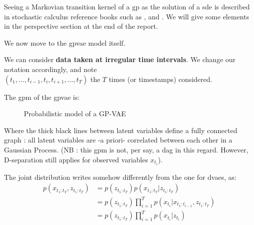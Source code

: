 Seeing a Markovian transition kernel of a \gls{gp} as the solution of a \gls{sde} is described in stochastic calculus reference books such as \cite{mouvement-brownien-calcul-ito}, \cite{sarkka_applied_2019} and \cite{cours-jf-legall}. We will give some elements in the perspective section at the end of the report.

We now move to the \gls{gpvae} model itself.

We can consider \textbf{data taken at irregular time intervals}. We change our notation accordingly, and note \\
$(t_1, ..., t_{i-1}, t_i, t_{i+1}, ..., t_T)$ the $T$ times (or timestamps) considered. 

The \gls{gpm} of the \gls{gpvae} is:

\begin{figure}[H]
    \centering
    \label{fig:graphical_model_gpvae}
\caption{Probabilistic model of a GP-VAE}
\end{figure}

Where the thick black lines between latent variables define a fully connected graph : all latent variables are -a priori- correlated between each other in a Gaussian Process. (NB : this \gls{gpm} is not, per say, a \gls{dag} in this regard. However, D-separation still applies for observed variables $x_{t_i}$).

The joint distribution writes somehow differently from the one for \glspl{dvae}, as:
\begin{align}
\label{joint_gpvae}
    p(x_{t_1:t_T}, z_{t_1:t_T}) &= p(z_{t_1:t_T}) p(x_{t_1:t_T} \vert z_{t_1:t_T}) \\
    &= p(z_{t_1:t_T}) \prod_{i=1}^T p(x_{t_i} \vert x_{t_1:t_{i-1}}, z_{t_1:t_T}) \\
    &= p(z_{t_1:t_T}) \prod_{i=1}^T p(x_{t_i} \vert z_{t_{i}})
\end{align}

